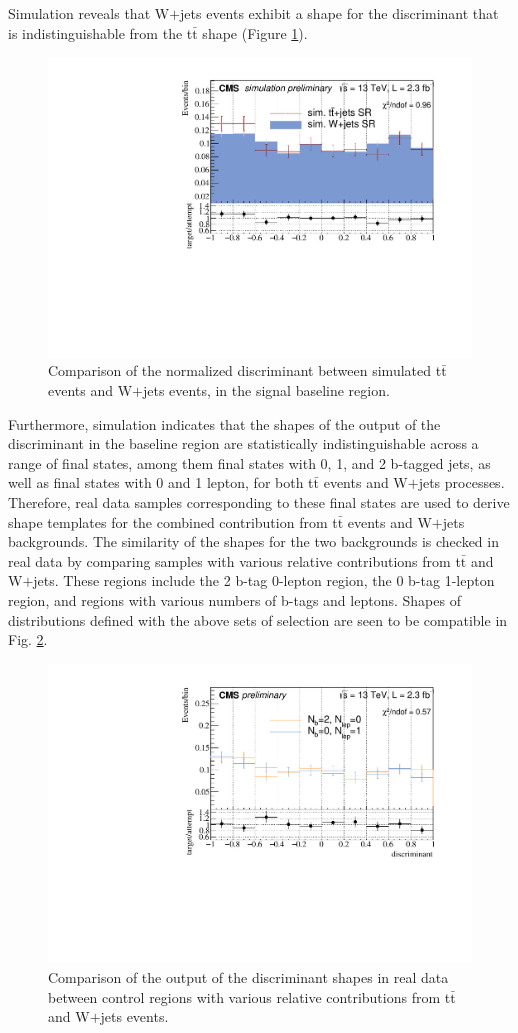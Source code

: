 Simulation reveals that W$+$jets events exhibit a shape for the discriminant that is indistinguishable from the t$\bar{\text{t}}$ shape (Figure \ref{fig:ttbarVsWjets}).
\begin{figure}[tb!]
\centering
\includegraphics[width=0.55\linewidth]{figures/SusySearches/MvaSusy/TTWSimCompare.pdf}
\caption{Comparison of the normalized discriminant between simulated t$\bar{\text{t}}$ events and W$+$jets events, in the signal baseline region.}
\label{fig:ttbarVsWjets}
\end{figure}
Furthermore, simulation indicates that the shapes of the output of the discriminant in the baseline region are statistically indistinguishable across a range of final states, among them final states with 0, 1, and 2 b-tagged jets, as well as final states with 0 and 1 lepton, for both t$\bar{\text{t}}$ events and W$+$jets processes. Therefore, real data samples corresponding to these final states are used to derive shape templates for the combined contribution from t$\bar{\text{t}}$ events and W$+$jets backgrounds. The similarity of the shapes for the two backgrounds is checked in real data by comparing samples with various relative contributions from t$\bar{\text{t}}$ and W$+$jets. These regions include the 2 b-tag 0-lepton region, the 0 b-tag 1-lepton region, and regions with various numbers of b-tags and leptons. Shapes of distributions defined with the above sets of selection are seen to be compatible in Fig. \ref{fig:data2b0lVs1b1l}.
\begin{figure}[tb!]
\centering
\includegraphics[width=0.55\linewidth]{figures/SusySearches/MvaSusy/Data_2b0Lvs0b1L.pdf}
\caption{Comparison of the output of the discriminant shapes in real data between control regions with various relative contributions from t$\bar{\text{t}}$ and W$+$jets events.}
\label{fig:data2b0lVs1b1l}
\end{figure}

